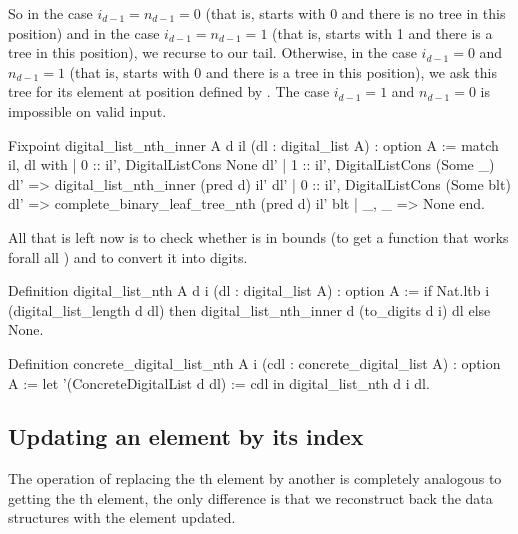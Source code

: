 \documentclass{article}
\begin{document}
So in the case $i_{d - 1} = n_{d - 1} = 0$ (that is,  starts with 0 and there is no tree in this position) and in the case $i_{d - 1} = n_{d - 1} = 1$ (that is,  starts with 1 and there is a tree in this position), we recurse to our tail. Otherwise, in the case $i_{d - 1} = 0$ and $n_{d - 1} = 1$ (that is,  starts with 0 and there is a tree in this position), we ask this tree for its element at position defined by . The case $i_{d - 1} = 1$ and $n_{d - 1} = 0$ is impossible on valid input. \pagebreak%

\begin{coq}
Fixpoint digital_list_nth_inner {A} d il (dl : digital_list A) : option A :=
  match il, dl with
  | 0 :: il', DigitalListCons None dl'
  | 1 :: il', DigitalListCons (Some _) dl' => digital_list_nth_inner (pred d) il' dl'
  | 0 :: il', DigitalListCons (Some blt) dl' => complete_binary_leaf_tree_nth (pred d) il' blt
  | _, _ => None
  end.
\end{coq}

All that is left now is to check whether  is in bounds (to get a function that works forall all ) and to convert it into digits.

\begin{coq}
Definition digital_list_nth {A} d i (dl : digital_list A) : option A :=
  if Nat.ltb i (digital_list_length d dl)
  then digital_list_nth_inner d (to_digits d i) dl
  else None.

Definition concrete_digital_list_nth {A} i (cdl : concrete_digital_list A) : option A :=
  let '(ConcreteDigitalList d dl) := cdl in digital_list_nth d i dl.
\end{coq}

\subsection{Updating an element by its index}

The operation of replacing the th element by another  is completely analogous to getting the th element, the only difference is that we reconstruct back the data structures with the element updated.
\end{document}
